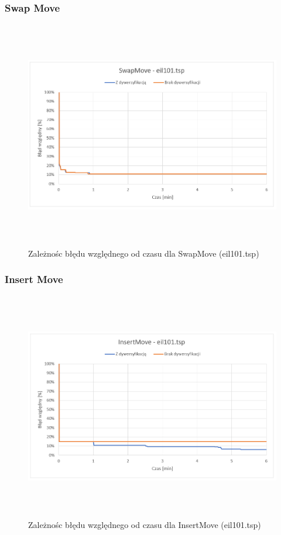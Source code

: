 \documentclass[a4paper,11pt]{article}
\begin{document}
\subsubsection{Swap Move}

\begin{figure}[H]
\centering
\includegraphics[height=10cm]{SwapMove101.PNG}
\caption{Zależnośc błędu względnego od czasu dla SwapMove (eil101.tsp)}
\end{figure}

\subsubsection{Insert Move}

\begin{figure}[H]
\centering
\includegraphics[height=10cm]{InsertMove101.PNG}
\caption{Zależnośc błędu względnego od czasu dla InsertMove (eil101.tsp)}
\end{figure}
\end{document}
